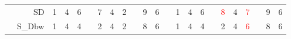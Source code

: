 \begin{landscape}
\begin{table}[!h]
\begin{tabular}{@{}crccccccccccccccccccccc@{}}
            & SD & 
            1  & 4  & 6 & \phantom{a}           
            & 7  & 4  & 2 & \phantom{a}        
            & 9  & 6 
            & \phantom{a} &
            1    & 4   & 6 & \phantom{a}           
            & \textcolor{red}{8}  & 4   & \textcolor{red}{7} & \phantom{a}        
            & 9   & 6                         \\
            
            &S\_Dbw & 
            1  & 4  & 4 & \phantom{a}           
            & 2  & 4  & 2 & \phantom{a}        
            & 8  & 6        
            & \phantom{a} &
            1    & 4   & 4 & \phantom{a}           
            & 2  & 4   & \textcolor{red}{6} & \phantom{a}        
            & 8   & 6                         \\
            
            \bottomrule                        
        \end{tabular}
    \end{table}
\end{landscape}

